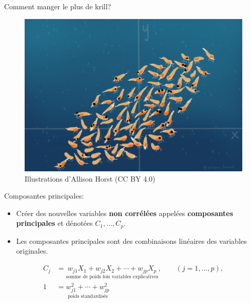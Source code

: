 \documentclass[
  ignorenonframetext,
]{beamer}
\providecommand{\tightlist}{%
  \setlength{\itemsep}{0pt}\setlength{\parskip}{0pt}}\usepackage{longtable,booktabs,array}
\begin{document}
\begin{frame}{Comment manger le plus de krill?}
\begin{figure}
\begin{minipage}[t]{0.50\linewidth}
{{\includegraphics{"figures/krill.png"}

}

}

\end{minipage}%

\caption{\label{fig-krill}Illustrations d'Allison Horst (CC BY 4.0)}

\end{figure}
\end{frame}

\begin{frame}{Composantes principales:}
\protect\hypertarget{composantes-principales}{}
\begin{itemize}
\tightlist
\item
  Créer des nouvelles variables \textbf{non corrélées} appelées
  \textbf{composantes principales} et dénotées \(C_1, \ldots, C_p\).
\item
  Les composantes principales sont des combinaisons linéaires des
  variables originales.
\end{itemize}

\begin{align*}
C_j &= \underset{\text{somme de poids fois variables explicatives}}{w_{j1} X_1 + w_{j2} X_2 + \cdots + w_{jp} X_p}, \qquad (j=1, \ldots, p),\\
1 &= \underset{\text{poids standardisés}}{w_{j1}^2 + \cdots + w_{jp}^2}
\end{align*}
\end{frame}
\end{document}
